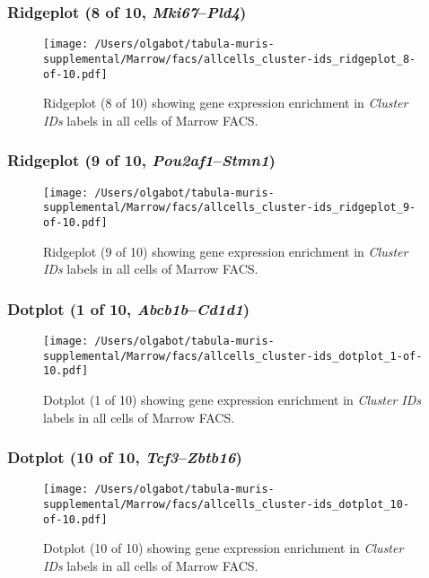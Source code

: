 \clearpage

\subsubsection{Ridgeplot (8 of 10, \emph{Mki67}--\emph{Pld4})}
\begin{figure}[h]
\centering
\texttt{[image: /Users/olgabot/tabula-muris-supplemental/Marrow/facs/allcells\_cluster-ids\_ridgeplot\_8-of-10.pdf]}

\caption{ Ridgeplot (8 of 10)  showing gene expression enrichment in \emph{Cluster IDs} labels in all cells of Marrow FACS. }
\end{figure}


\clearpage

\subsubsection{Ridgeplot (9 of 10, \emph{Pou2af1}--\emph{Stmn1})}
\begin{figure}[h]
\centering
\texttt{[image: /Users/olgabot/tabula-muris-supplemental/Marrow/facs/allcells\_cluster-ids\_ridgeplot\_9-of-10.pdf]}

\caption{ Ridgeplot (9 of 10)  showing gene expression enrichment in \emph{Cluster IDs} labels in all cells of Marrow FACS. }
\end{figure}


\clearpage

\subsubsection{Dotplot (1 of 10, \emph{Abcb1b}--\emph{Cd1d1})}
\begin{figure}[h]
\centering
\texttt{[image: /Users/olgabot/tabula-muris-supplemental/Marrow/facs/allcells\_cluster-ids\_dotplot\_1-of-10.pdf]}

\caption{ Dotplot (1 of 10)  showing gene expression enrichment in \emph{Cluster IDs} labels in all cells of Marrow FACS. }
\end{figure}


\clearpage

\subsubsection{Dotplot (10 of 10, \emph{Tcf3}--\emph{Zbtb16})}
\begin{figure}[h]
\centering
\texttt{[image: /Users/olgabot/tabula-muris-supplemental/Marrow/facs/allcells\_cluster-ids\_dotplot\_10-of-10.pdf]}

\caption{ Dotplot (10 of 10)  showing gene expression enrichment in \emph{Cluster IDs} labels in all cells of Marrow FACS. }
\end{figure}


